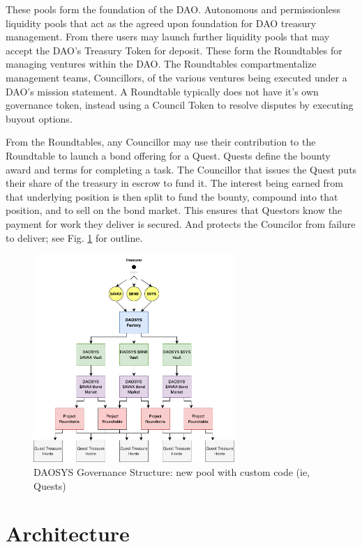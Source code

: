 \documentclass[journal,twocolumn,12pt]{ieeesyscoin}
\begin{document}
These pools form the foundation of the DAO. Autonomous and permissionless liquidity pools that act as the agreed upon foundation for DAO treasury management. From there users may launch further liquidity pools that may accept the DAO's Treasury Token for deposit. These form the Roundtables for managing ventures within the DAO. The Roundtables compartmentalize management teams, Councillors, of the various ventures being executed under a DAO’s mission statement. A Roundtable typically does not have it’s own governance token, instead using a Council Token to resolve disputes by executing buyout options.

From the Roundtables, any Councillor may use their contribution to the Roundtable to launch a bond offering for a Quest. Quests define the bounty award and terms for completing a task. The Councillor that issues the Quest puts their share of the treasury in escrow to fund it. The interest being earned from that underlying position is then split to fund the bounty, compound into that position, and to sell on the bond market. This ensures that Questors know the payment for work they deliver is secured. And protects the Councilor from failure to deliver; see Fig. \ref{fig:daosys_governance} for outline.

\begin{figure}[h!]
\includegraphics[width=3in]{img/governance.png}
\caption{DAOSYS Governance Structure: new pool with custom code (ie, Quests)} 
\label{fig:daosys_governance}
\end{figure} 

\section{Architecture}
\label{sec:architecture}
\end{document}
